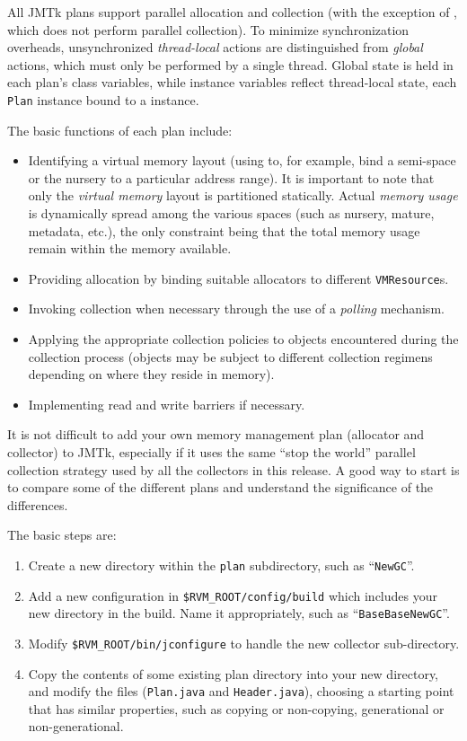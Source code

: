 All JMTk plans support parallel allocation and collection (with the
exception of , which does not perform parallel
collection).  To minimize synchronization overheads, unsynchronized
\emph{thread-local} actions are distinguished from \emph{global}
actions, which must only be performed by a single thread.  Global
state is held in each plan's class variables, while instance variables
reflect thread-local state, each \texttt{Plan} instance bound to a
 instance.

The basic functions of each plan include:
\begin{itemize}
\item Identifying a virtual memory layout (using
   to, for example, bind a
  semi-space or the nursery to a particular address range).  It is
  important to note that only the \emph{virtual memory} layout is
  partitioned statically.  Actual \emph{memory usage} is dynamically
  spread among the various spaces (such as nursery, mature, metadata,
  etc.), the only constraint being that the total memory usage remain
  within the memory available.
\item Providing allocation by binding suitable allocators to different
  \texttt{VMResource}s.
\item Invoking collection when necessary through the use of a
  \emph{polling} mechanism.
\item Applying the appropriate collection policies to objects
  encountered during the collection process (objects may be subject to
  different collection regimens depending on where they reside in
  memory).
\item Implementing read and write barriers if necessary.
\end{itemize}

It is not difficult to add your own memory management plan (allocator
and collector) to JMTk, especially if it uses the same ``stop the
world'' parallel collection strategy used by all the collectors in
this release.  A good way to start is to compare some of the different
plans and understand the significance of the differences.

The basic steps are:

%
%
\begin{enumerate}
\item Create a new directory within the \texttt{plan} subdirectory, such as
  ``\texttt{NewGC}''.
\item Add a new configuration in \texttt{\$RVM\_\-ROOT/config/build}
  which includes your new directory in the build.  Name it
  appropriately, such as ``\texttt{BaseBaseNewGC}''.
\item Modify \texttt{\$RVM\_\-ROOT/bin/jconfigure} to handle the new
  collector sub-directory.
\item Copy the contents of some existing plan directory into your new
  directory, and modify the files (\texttt{Plan.java} and
  \texttt{Header.java}), choosing a starting point that has similar
  properties, such as copying or non-copying, generational or
  non-generational.
\end{enumerate}


